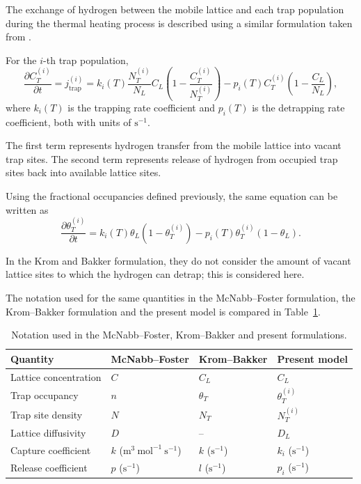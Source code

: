\documentclass[a4paper,12pt,oneside]{report}
\begin{document}
The exchange of hydrogen between the mobile lattice and each trap population during the thermal heating process is described using a similar formulation taken from \cite{Marrani2025,MartinezPaneda2020}.

For the $i$-th trap population,
\begin{equation}
\frac{\partial C_T^{(i)}}{\partial t}
=
j_{\mathrm{trap}}^{(i)}
=
k_i(T)
\frac{N_T^{(i)}}{N_L}
C_L
\left(
1-\frac{C_T^{(i)}}{N_T^{(i)}}
\right)
-
p_i(T)
C_T^{(i)}
\left(
1-\frac{C_L}{N_L}
\right),
\label{eq:ch3_mcnabb_molar}
\end{equation}
where $k_i(T)$ is the trapping rate coefficient and $p_i(T)$ is the detrapping rate coefficient, both with units of $\mathrm{s^{-1}}$.

The first term represents hydrogen transfer from the mobile lattice into vacant trap sites. The second term represents release of hydrogen from occupied trap sites back into available lattice sites.

Using the fractional occupancies defined previously, the same equation can be written as
\begin{equation}
\frac{\partial \theta_T^{(i)}}{\partial t}
=
k_i(T)\theta_L
\left(1-\theta_T^{(i)}\right)
-
p_i(T)\theta_T^{(i)}
\left(1-\theta_L\right).
\label{eq:ch3_mcnabb_occupancy}
\end{equation}

In the Krom and Bakker formulation, they do not consider the amount of vacant lattice sites to which the hydrogen can detrap; this is considered here.

The notation used for the same quantities in the McNabb--Foster formulation, the Krom--Bakker formulation and the present model is compared in Table~\ref{tab:ch3_notation}.

\begin{table}[htbp]
\centering
\caption{Notation used in the McNabb--Foster, Krom--Bakker and present formulations.}
\label{tab:ch3_notation}
\begin{tabular}{llll}
\hline
Quantity & McNabb--Foster & Krom--Bakker & Present model \\
\hline
Lattice concentration & $C$ & $C_L$ & $C_L$ \\
Trap occupancy & $n$ & $\theta_T$ & $\theta_T^{(i)}$ \\
Trap site density & $N$ & $N_T$ & $N_T^{(i)}$ \\
Lattice diffusivity & $D$ & -- & $D_L$ \\
Capture coefficient & $k$ ($\mathrm{m^3~mol^{-1}~s^{-1}}$) & $k$ ($\mathrm{s^{-1}}$) & $k_i$ ($\mathrm{s^{-1}}$) \\
Release coefficient & $p$ ($\mathrm{s^{-1}}$) & $l$ ($\mathrm{s^{-1}}$) & $p_i$ ($\mathrm{s^{-1}}$) \\
\hline
\end{tabular}
\end{table}
\end{document}
